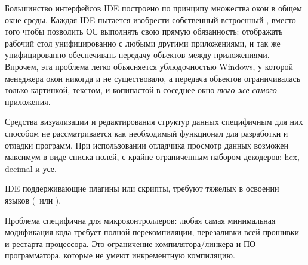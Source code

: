 
Большинство интерфейсов IDE построено по принципу множества окон в общем окне
среды. Каждая IDE пытается изобрести собственный встроенный ,
вместо того чтобы позволить ОС выполнять свою прямую обязанность:
отображать рабочий стол унифицированно с любыми другими приложениями, и так же
унифицированно обеспечивать передачу объектов между приложениями.
Впрочем, эта проблема легко объясняется ублюдочностью Windows, у которой
менеджера окон никогда и не существовало, а передача объектов ограничивалась
только картинкой, текстом, и копипастой в соседнее окно \textit{того же
самого} приложения.

\label{ideviz}

Средства визуализации и редактирования структур данных специфичным для них
способом не рассматривается как необходимый функционал для разработки и отладки
программ. При использовании отладчика просмотр данных возможен максимум в виде
списка полей, с крайне ограниченным набором декодеров: hex, decimal и усе.


IDE поддерживающие плагины или скрипты, требуют тяжелых в освоении языков
(\java\ или \lisp).


Проблема специфична для микроконтроллеров: любая самая минимальная модификация
кода требует полной перекомпиляции, перезаливки всей прошивки и рестарта
процессора. Это ограничение компилятора/линкера и ПО программатора, которые не
умеют инкрементную компиляцию.

\secup



\secup
